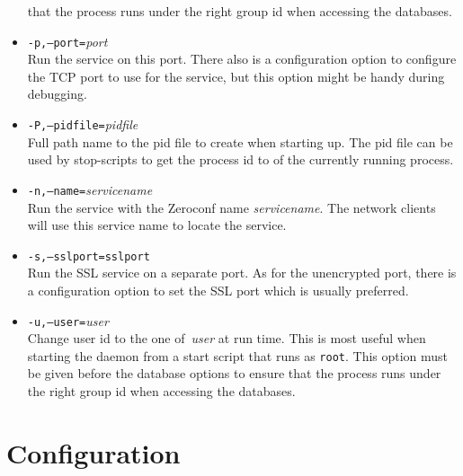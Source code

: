 \begin{itemize}
that the process runs under the right group id when accessing the
databases.
\item
\texttt{-p,--port=}\textit{port}
\\
Run the service on this port.
There also is a configuration option to configure the TCP port to use
for the service, but this option might be handy during debugging.
\item
\texttt{-P,--pidfile=}\textit{pidfile}
\\
Full path name to the pid file to create when starting up.
The pid file can be used by stop-scripts to get the process id
to of the currently running process.
\item
\texttt{-n,--name=}\textit{servicename}
\\
Run the service with the Zeroconf name \textit{servicename}.
The network clients will use this service name to locate the service.
\item
\texttt{-s,--sslport=}\texttt{sslport}
\\
Run the SSL service on a separate port.
As for the unencrypted port, there is a configuration option to set the
SSL port which is usually preferred.
\item
\texttt{-u,--user=}\textit{user}
\\
Change user id to the one of~\textit{user} at run time.
This is most useful when starting the daemon from a start script
that runs as \texttt{root}.
This option must be given before the database options to ensure
that the process runs under the right group id when accessing the
databases.

\end{itemize}

\section{Configuration}




